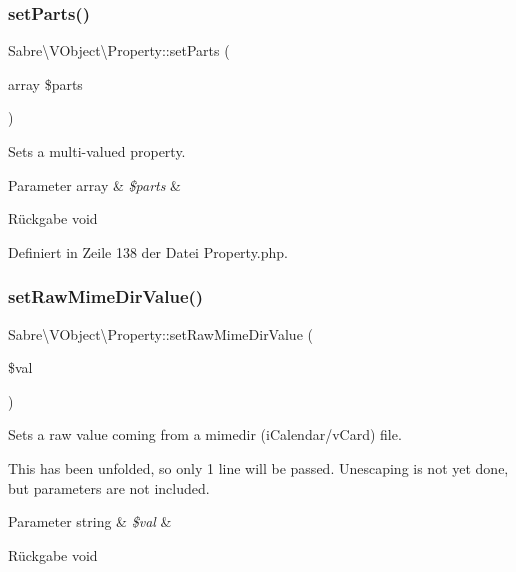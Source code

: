 \subsubsection{\texorpdfstring{set\+Parts()}{setParts()}}
{\footnotesize\ttfamily Sabre\textbackslash{}\+V\+Object\textbackslash{}\+Property\+::set\+Parts (\begin{DoxyParamCaption}\item[{array}]{\$parts }\end{DoxyParamCaption})}

Sets a multi-\/valued property.


\begin{DoxyParams}[1]{Parameter}
array & {\em \$parts} & \\
\hline
\end{DoxyParams}
\begin{DoxyReturn}{Rückgabe}
void 
\end{DoxyReturn}


Definiert in Zeile 138 der Datei Property.\+php.

\mbox{\label{class_sabre_1_1_v_object_1_1_property_ab6e883a440998a57a51aa6c4fb65b947}} 
\subsubsection{\texorpdfstring{set\+Raw\+Mime\+Dir\+Value()}{setRawMimeDirValue()}}
{\footnotesize\ttfamily Sabre\textbackslash{}\+V\+Object\textbackslash{}\+Property\+::set\+Raw\+Mime\+Dir\+Value (\begin{DoxyParamCaption}\item[{}]{\$val }\end{DoxyParamCaption})\hspace{0.3cm}{\ttfamily [abstract]}}

Sets a raw value coming from a mimedir (i\+Calendar/v\+Card) file.

This has been \textquotesingle{}unfolded\textquotesingle{}, so only 1 line will be passed. Unescaping is not yet done, but parameters are not included.


\begin{DoxyParams}[1]{Parameter}
string & {\em \$val} & \\
\hline
\end{DoxyParams}
\begin{DoxyReturn}{Rückgabe}
void 
\end{DoxyReturn}
\mbox{\label{class_sabre_1_1_v_object_1_1_property_ae323a5e508abb9bd96449dc7b09f8bf5}} 

